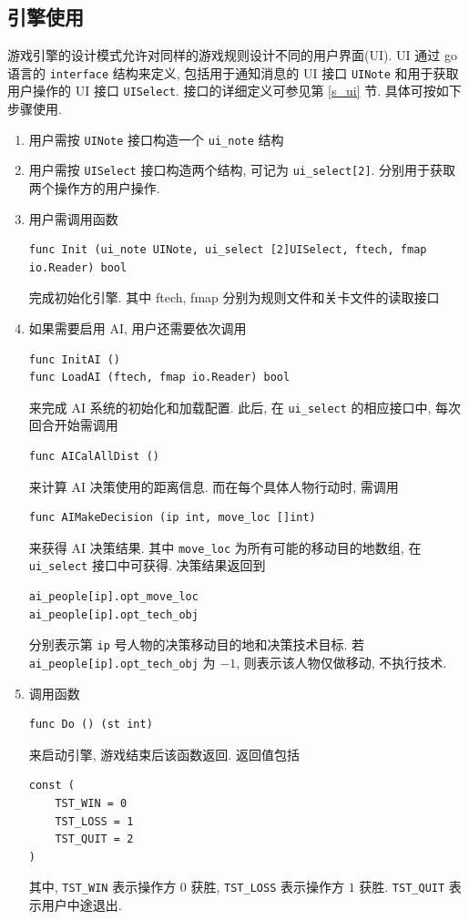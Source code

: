 \documentclass[UTF8, zihao=-4]{ctexart} %
\newcommand{\lcode}{\lstinline} % 段内插入代码
\begin{document}
\subsection{引擎使用}
游戏引擎的设计模式允许对同样的游戏规则设计不同的用户界面(UI). UI 通过 go 语言的 \lcode{interface} 结构来定义,
包括用于通知消息的 UI 接口 \lcode{UINote} 和用于获取用户操作的 UI 接口 \lcode{UISelect}.
接口的详细定义可参见第 \ref{s_ui} 节.
具体可按如下步骤使用.
\begin{enumerate}
      \item 用户需按 \lcode{UINote} 接口构造一个 \lcode{ui_note} 结构
      \item 用户需按 \lcode{UISelect} 接口构造两个结构, 可记为 \lcode{ui_select[2]}. 分别用于获取两个操作方的用户操作.
      \item 用户需调用函数
            \begin{lstlisting}
func Init (ui_note UINote, ui_select [2]UISelect, ftech, fmap io.Reader) bool 
            \end{lstlisting}
            完成初始化引擎. 其中 ftech, fmap 分别为规则文件和关卡文件的读取接口
      \item 如果需要启用 AI, 用户还需要依次调用
            \begin{lstlisting}
func InitAI ()
func LoadAI (ftech, fmap io.Reader) bool
            \end{lstlisting}
            来完成 AI 系统的初始化和加载配置. 此后, 在 \lcode{ui_select} 的相应接口中, 每次回合开始需调用
            \begin{lstlisting}
func AICalAllDist () 
            \end{lstlisting}
            来计算 AI 决策使用的距离信息.
            而在每个具体人物行动时, 需调用
            \begin{lstlisting}
func AIMakeDecision (ip int, move_loc []int)
            \end{lstlisting}
            来获得 AI 决策结果. 其中 \lcode{move_loc} 为所有可能的移动目的地数组, 在 \lcode{ui_select} 接口中可获得.
            决策结果返回到
            \begin{lstlisting}
ai_people[ip].opt_move_loc
ai_people[ip].opt_tech_obj
            \end{lstlisting}
            分别表示第 \lcode{ip} 号人物的决策移动目的地和决策技术目标. 若 \lcode{ai_people[ip].opt_tech_obj} 为 $-1$,
            则表示该人物仅做移动, 不执行技术.
      \item 调用函数  
            \begin{lstlisting}
func Do () (st int)
            \end{lstlisting}
            来启动引擎, 游戏结束后该函数返回. 返回值包括
            \begin{lstlisting}
const (
	TST_WIN = 0
	TST_LOSS = 1
	TST_QUIT = 2
)
            \end{lstlisting}
            其中, \lcode{TST_WIN} 表示操作方 $0$ 获胜, \lcode{TST_LOSS} 表示操作方 $1$ 获胜. \lcode{TST_QUIT} 表示用户中途退出.
\end{enumerate}
\end{document}
